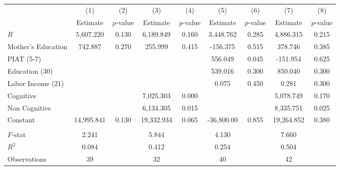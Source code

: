 \begin{tabular}{lcccccccc} \toprule
 & (1) & (2) & (3) & (4) & (5) & (6) & (7) & (8) \\ 
 & Estimate  & $p$-value  & Estimate  & $p$-value  & Estimate  & $p$-value  & Estimate  & $p$-value  \\  \midrule
$R$ &  5,607.220 &     0.130 &  6,189.849 &     0.160 &  3,448.762 &     0.285 &  4,886.315 &     0.215 \\  
Mother's Education &   742.887 &     0.270 &   255.999 &     0.415 &  -156.375 &     0.515 &   378.746 &     0.385 \\  
PIAT (5-7) &         &         &         &         &   556.049 &     0.045 &  -151.954 &     0.625 \\  
Education (30) &         &         &         &         &   539.016 &     0.300 &   850.040 &     0.300 \\  
Labor Income (21) &         &         &         &         &     0.075 &     0.450 &     0.281 &     0.300 \\  
Cognitive &         &         &  7,025.303 &     0.000 &         &         &  5,078.749 &     0.170 \\  
Non Cognitive &         &         &  6,134.305 &     0.015 &         &         &  8,335.751 &     0.025 \\  
Constant & 14,995.841 &     0.130 & 19,332.934 &     0.065 & -36,800.00 &     0.855 & 19,264.852 &     0.380 \\  \\ \midrule
$F$-stat &     2.241 &         &     5.844 &         &     4.130 &         &     7.660 &         \\  
$R^2$ &     0.084 &         &     0.412 &         &     0.254 &         &     0.504 &         \\  
Observations &    39 &         &    32 &         &    40 &         &    42 &         \\  
\bottomrule \end{tabular}
